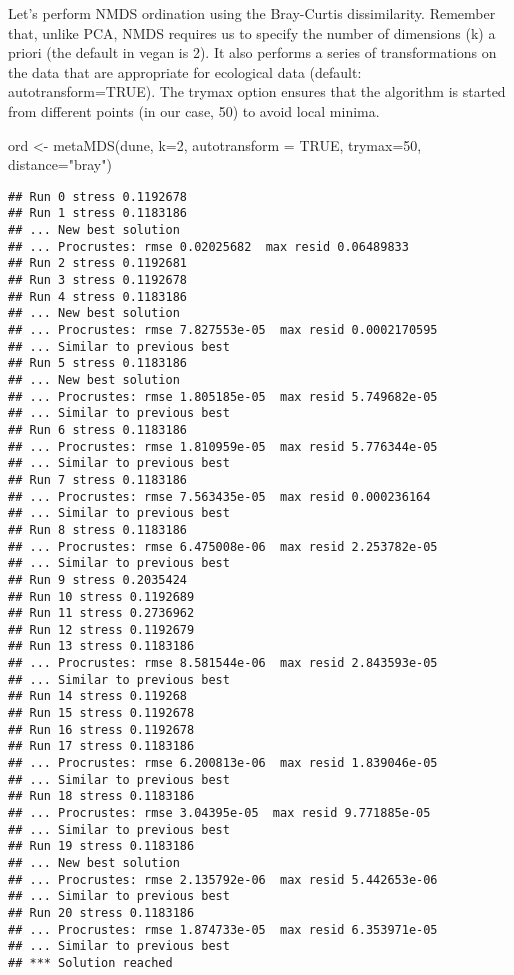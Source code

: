 \documentclass[
]{book}
\newenvironment{Shaded}{\begin{snugshade}}{\end{snugshade}}
\newcommand{\AttributeTok}[1]{\textcolor[rgb]{0.77,0.63,0.00}{#1}}
\newcommand{\ConstantTok}[1]{\textcolor[rgb]{0.00,0.00,0.00}{#1}}
\newcommand{\DecValTok}[1]{\textcolor[rgb]{0.00,0.00,0.81}{#1}}
\newcommand{\FunctionTok}[1]{\textcolor[rgb]{0.00,0.00,0.00}{#1}}
\newcommand{\NormalTok}[1]{#1}
\newcommand{\OtherTok}[1]{\textcolor[rgb]{0.56,0.35,0.01}{#1}}
\newcommand{\StringTok}[1]{\textcolor[rgb]{0.31,0.60,0.02}{#1}}
\begin{document}
Let's perform NMDS ordination using the Bray-Curtis dissimilarity. Remember that, unlike PCA, NMDS requires us to specify the number of dimensions (k) a priori (the default in vegan is 2). It also performs a series of transformations on the data that are appropriate for ecological data (default: autotransform=TRUE). The trymax option ensures that the algorithm is started from different points (in our case, 50) to avoid local minima.

\begin{Shaded}
\begin{Highlighting}[]
\NormalTok{ord }\OtherTok{\textless{}{-}} \FunctionTok{metaMDS}\NormalTok{(dune, }\AttributeTok{k=}\DecValTok{2}\NormalTok{, }\AttributeTok{autotransform =} \ConstantTok{TRUE}\NormalTok{, }\AttributeTok{trymax=}\DecValTok{50}\NormalTok{, }\AttributeTok{distance=}\StringTok{"bray"}\NormalTok{)}
\end{Highlighting}
\end{Shaded}

\begin{verbatim}
## Run 0 stress 0.1192678 
## Run 1 stress 0.1183186 
## ... New best solution
## ... Procrustes: rmse 0.02025682  max resid 0.06489833 
## Run 2 stress 0.1192681 
## Run 3 stress 0.1192678 
## Run 4 stress 0.1183186 
## ... New best solution
## ... Procrustes: rmse 7.827553e-05  max resid 0.0002170595 
## ... Similar to previous best
## Run 5 stress 0.1183186 
## ... New best solution
## ... Procrustes: rmse 1.805185e-05  max resid 5.749682e-05 
## ... Similar to previous best
## Run 6 stress 0.1183186 
## ... Procrustes: rmse 1.810959e-05  max resid 5.776344e-05 
## ... Similar to previous best
## Run 7 stress 0.1183186 
## ... Procrustes: rmse 7.563435e-05  max resid 0.000236164 
## ... Similar to previous best
## Run 8 stress 0.1183186 
## ... Procrustes: rmse 6.475008e-06  max resid 2.253782e-05 
## ... Similar to previous best
## Run 9 stress 0.2035424 
## Run 10 stress 0.1192689 
## Run 11 stress 0.2736962 
## Run 12 stress 0.1192679 
## Run 13 stress 0.1183186 
## ... Procrustes: rmse 8.581544e-06  max resid 2.843593e-05 
## ... Similar to previous best
## Run 14 stress 0.119268 
## Run 15 stress 0.1192678 
## Run 16 stress 0.1192678 
## Run 17 stress 0.1183186 
## ... Procrustes: rmse 6.200813e-06  max resid 1.839046e-05 
## ... Similar to previous best
## Run 18 stress 0.1183186 
## ... Procrustes: rmse 3.04395e-05  max resid 9.771885e-05 
## ... Similar to previous best
## Run 19 stress 0.1183186 
## ... New best solution
## ... Procrustes: rmse 2.135792e-06  max resid 5.442653e-06 
## ... Similar to previous best
## Run 20 stress 0.1183186 
## ... Procrustes: rmse 1.874733e-05  max resid 6.353971e-05 
## ... Similar to previous best
## *** Solution reached
\end{verbatim}
\end{document}
